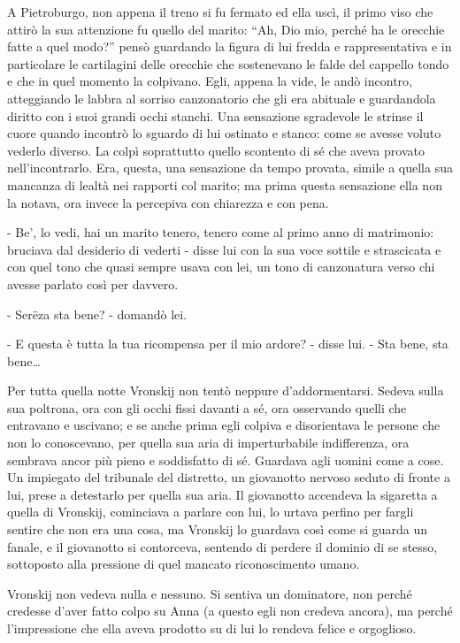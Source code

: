 A Pietroburgo, non appena il treno si fu fermato ed ella uscì, il primo viso che attirò la sua attenzione fu quello del marito: ``Ah, Dio mio, perché ha le orecchie fatte a quel modo?'' pensò guardando la figura di lui fredda e rappresentativa e in particolare le cartilagini delle orecchie che sostenevano le falde del cappello tondo e che in quel momento la colpivano. Egli, appena la vide, le andò incontro, atteggiando le labbra al sorriso canzonatorio che gli era abituale e guardandola diritto con i suoi grandi occhi stanchi. Una sensazione sgradevole le strinse il cuore quando incontrò lo sguardo di lui ostinato e stanco: come se avesse voluto vederlo diverso. La colpì soprattutto quello scontento di sé che aveva provato nell'incontrarlo. Era, questa, una sensazione da tempo provata, simile a quella sua mancanza di lealtà nei rapporti col marito; ma prima questa sensazione ella non la notava, ora invece la percepiva con chiarezza e con pena. 

- Be', lo vedi, hai un marito tenero, tenero come al primo anno di matrimonio: bruciava dal desiderio di vederti - disse lui con la sua voce sottile e strascicata e con quel tono che quasi sempre usava con lei, un tono di canzonatura verso chi avesse parlato così per davvero. 

- Serëza sta bene? - domandò lei. 

- E questa è tutta la tua ricompensa per il mio ardore? - disse lui. - Sta bene, sta bene\ldots{} 

\label{xxxi} 

Per tutta quella notte Vronskij non tentò neppure d'addormentarsi. Sedeva sulla sua poltrona, ora con gli occhi fissi davanti a sé, ora osservando quelli che entravano e uscivano; e se anche prima egli colpiva e disorientava le persone che non lo conoscevano, per quella sua aria di imperturbabile indifferenza, ora sembrava ancor più pieno e soddisfatto di sé. Guardava agli uomini come a cose. Un impiegato del tribunale del distretto, un giovanotto nervoso seduto di fronte a lui, prese a detestarlo per quella sua aria. Il giovanotto accendeva la sigaretta a quella di Vronskij, cominciava a parlare con lui, lo urtava perfino per fargli sentire che non era una cosa, ma Vronskij lo guardava così come si guarda un fanale, e il giovanotto si contorceva, sentendo di perdere il dominio di se stesso, sottoposto alla pressione di quel mancato riconoscimento umano. 

Vronskij non vedeva nulla e nessuno. Si sentiva un dominatore, non perché credesse d'aver fatto colpo su Anna (a questo egli non credeva ancora), ma perché l'impressione che ella aveva prodotto su di lui lo rendeva felice e orgoglioso. 

